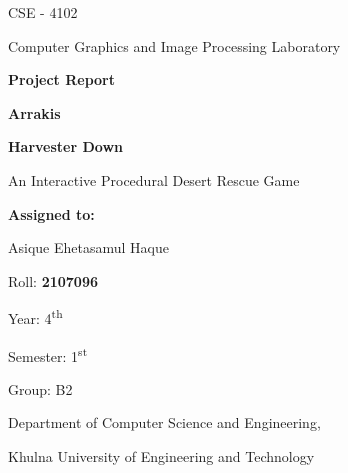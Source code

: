 \documentclass[11pt,a4paper]{article}
\begin{document}
\hypersetup{pageanchor=false}
\begin{titlepage}
\centering
\vspace*{10mm}
{\large CSE - 4102\par}
\vspace{3mm}
{\normalsize Computer Graphics and Image Processing Laboratory\par}
\vspace{10mm}
{\fontsize{40}{46}\selectfont\bfseries Project Report\par}
\vspace{16mm}
{\fontsize{28}{34}\selectfont\bfseries Arrakis\par}
\vspace{3mm}
{\fontsize{22}{28}\selectfont\bfseries Harvester Down\par}
\vspace{6mm}
{\large An Interactive Procedural Desert Rescue Game\par}
\vfill
{\small\bfseries Assigned to:\par}
\vspace{5mm}
{\large Asique Ehetasamul Haque\par}
\vspace{2mm}
{\large Roll: \textbf{2107096}\par}
{\large Year: 4\textsuperscript{th}\par}
{\large Semester: 1\textsuperscript{st}\par}
{\large Group: B2\par}
\vspace{4mm}
{\normalsize Department of Computer Science and Engineering,\par}
{\normalsize Khulna University of Engineering and Technology\par}
\vspace*{9mm}
\end{titlepage}
\hypersetup{pageanchor=true}
\tableofcontents
\clearpage
{}






\end{document}
